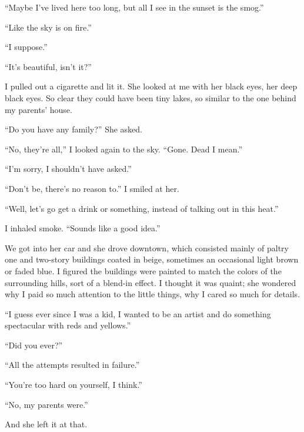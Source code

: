 ``Maybe I've lived here too long, but all I see in the sunset is the
smog.''

``Like the sky is on fire.''

``I suppose.''

``It's beautiful, isn't it?''

I pulled out a cigarette and lit it. She looked at me with her black
eyes, her deep black eyes. So clear they could have been tiny lakes, so
similar to the one behind my parents' house.

``Do you have any family?'' She asked.

``No, they're all,'' I looked again to the sky. ``Gone. Dead I mean.''

``I'm sorry, I shouldn't have asked.''

``Don't be, there's no reason to.'' I smiled at her.

``Well, let's go get a drink or something, instead of talking out in
this heat.''

I inhaled smoke. ``Sounds like a good idea.''

We got into her car and she drove downtown, which consisted mainly of
paltry one and two-story buildings coated in beige, sometimes an
occasional light brown or faded blue. I figured the buildings were
painted to match the colors of the surrounding hills, sort of a blend-in
effect. I thought it was quaint; she wondered why I paid so much
attention to the little things, why I cared so much for details.

``I guess ever since I was a kid, I wanted to be an artist and do
something spectacular with reds and yellows.''

``Did you ever?''

``All the attempts resulted in failure.''

``You're too hard on yourself, I think.''

``No, my parents were.''

And she left it at that.

